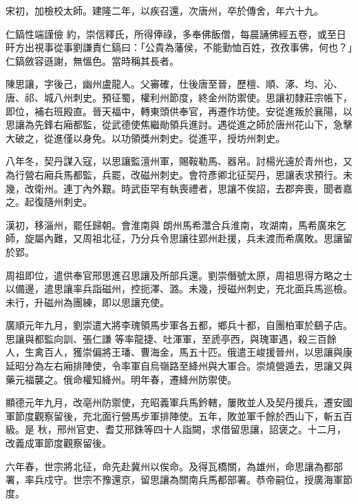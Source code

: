 \begin{pinyinscope}
 宋初，加檢校太師。建隆二年，以疾召還，次唐州，卒於傳舍，年六十九。



 仁鎬性端謹儉
 約，崇信釋氏，所得俸祿，多奉佛飯僧，每晨誦佛經五卷，或至日旰方出視事從事劉謙責仁鎬曰：「公貴為藩侯，不能勤恤百姓，孜孜事佛，何也？」仁鎬斂容遜謝，無慍色。當時稱其長者。



 陳思讓，字後己，幽州盧龍人。父審確，仕後唐至晉，歷檀、順、涿、均、沁、唐、祁、城八州刺史。預征蜀，權利州節度，終金州防禦使。思讓初隸莊宗帳下，即位，補右班殿直。晉天福中，轉東頭供奉官，再遷作坊使。安從進叛於襄陽，以
 思讓為先鋒右廂都監，從武德使焦繼勛領兵進討。遇從進之師於唐州花山下，急擊大破之，從進僅以身免。以功領獎州刺史。從進平，授坊州刺史。



 八年冬，契丹謀入寇，以思讓監澶州軍，賜鞍勒馬、器帛。討楊光遠於青州也，又為行營右廂兵馬都監，兵罷，改磁州刺史。會符彥卿北征契丹，思讓表求預行。未幾，改衛州。連丁內外艱。時武臣罕有執喪禮者，思讓不俟詔，去郡奔喪，聞者嘉之。起復隨州刺史。



 漢初，移淄州，罷任歸朝。會淮南與
 朗州馬希灊合兵淮南，攻湖南，馬希廣來乞師，旋屬內難，又周祖北征，乃分兵令思讓往郢州赴援，兵未渡而希廣敗。思讓留於郢。



 周祖即位，遣供奉官邢思進召思讓及所部兵還。劉崇僭號太原，周祖思得方略之士以備邊，遣思讓率兵詣磁州，控扼澤、潞。未幾，授磁州刺史，充北面兵馬巡檢。未行，升磁州為團練，即以思讓充使。



 廣順元年九月，劉崇遣大將李瑰領馬步軍各五都，鄉兵十都，自團柏軍於鷂子店。思讓與都監向訓、張仁謙
 等率龍捷、吐渾軍，至虒亭西，與瑰軍遇，殺三百餘人，生禽百人，獲崇偏將王璠、曹海金，馬五十匹。俄遣王峻援晉州，以思讓與康延昭分為左右廂排陣使，令率軍自烏嶺路至絳州與大軍合。崇燒營遁去，思讓又與藥元福襲之。俄命權知絳州。明年春，遷絳州防禦使。



 顯德元年九月，改亳州防禦使，充昭義軍兵馬鈐轄，屢敗並人及契丹援兵，遷安國軍節度觀察留後，充北面行營馬步軍排陣使。五年，敗並軍千餘於西山下，斬五百級。是
 秋，邢州官吏、耆艾邢銖等四十人詣闕，求借留思讓，詔褒之。十二月，改義成軍節度觀察留後。



 六年春，世宗將北征，命先赴冀州以俟命。及得瓦橋關，為雄州，命思讓為都部署，率兵戍守。世宗不豫還京，留思讓為關南兵馬都部署。恭帝嗣位，授廣海軍節度。




\end{pinyinscope}
